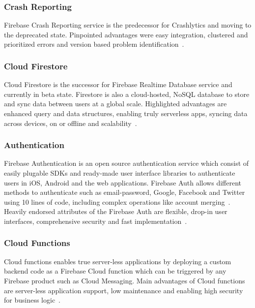 \subsubsection{Crash Reporting} Firebase Crash Reporting service is
the predecessor for Crashlytics and moving to the deprecated
state. Pinpointed advantages were easy integration, clustered and
prioritized errors and version based problem
identification~\cite{hid-sp18-409-www-firebase-products}.

\subsubsection{Cloud Firestore} Cloud Firestore is the successor for
Firebase Realtime Database service and currently in beta
state. Firestore is also a cloud-hosted, NoSQL database to store and
sync data between users at a global scale. Highlighted advantages are
enhanced query and data structures, enabling truly serverless apps,
syncing data across devices, on or offline and
scalability~\cite{hid-sp18-409-www-firebase-official,
  hid-sp18-409-www-firebase-products}.

\subsubsection{Authentication} Firebase Authentication is an open
source authentication service which consist of easily plugable SDKs
and ready-made user interface libraries to authenticate users in iOS,
Android and the web applications. Firebase Auth allows different
methods to authenticate such as email-password, Google, Facebook and
Twitter using 10 lines of code, including complex operations like
account merging~\cite{hid-sp18-409-www-firebase-products}. Heavily
endorsed attributes of the Firebase Auth are flexible, drop-in user
interfaces, comprehensive security and fast
implementation~\cite{hid-sp18-409-www-firebase-wikipedia}.

\subsubsection{Cloud Functions} Cloud functions enables true
server-less applications by deploying a custom backend code as a
Firebase Cloud function which can be triggered by any Firebase
product such as Cloud Messaging. Main advantages of Cloud functions
are server-less application support, low maintenance and enabling high
security for business logic~\cite{hid-sp18-409-www-firebase-products}.

